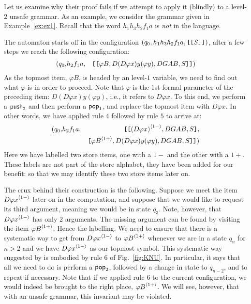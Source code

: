 Let us examine why their proof fails if we attempt to apply it
(blindly) to a level-$2$ unsafe grammar. As an example, we
consider the grammar given in Example~\ref{ex:ex1}. Recall that
the word $h_1h_3h_2f_1a$ is \emph{not} in the language.

The automaton starts off in the configuration $(q_0, h_1h_3h_2f_1a,
\hbox{\tt [}{\hbox{\tt [}{S}\hbox{\tt ]}}\hbox{\tt ]})$, after a few steps we reach the following configuration:
\begin{eqnarray}
\nonumber (q_0, & h_2f_1a, & \hbox{\tt [}{\hbox{\tt [}{\varphi B, D(D \varphi x) y (\varphi y), DGAB,S}\hbox{\tt ]}}\hbox{\tt ]})
\end{eqnarray}
As the topmost item, $\varphi B$, is headed by an level-$1$
variable, we need to find out what $\varphi$ is in order to
proceed. Note that $\varphi$ is the $1$st formal parameter of the
preceding item: $ D (D \varphi x) y (\varphi y)$, i.e., it refers
to $D \varphi x$. To this end, we perform a ${\sf push}_2$ and then
perform a ${\sf pop}_1$, and replace the topmost item with $D \varphi
x$. In other words, we have applied rule $4$ followed by rule $5$
to arrive at:
\begin{eqnarray}
\nonumber (q_0, & h_2f_1a, & \hbox{\tt [}\hbox{\tt [}{{(D \varphi x)}^{\langle{1-}\rangle}, DGAB, S}\hbox{\tt ]},\\
\nonumber & & \hbox{\tt [}{{\varphi B}^{\langle{1+}\rangle}, D (D \varphi x) y (\varphi
y), DGAB,S}\hbox{\tt ]}\hbox{\tt ]})
\end{eqnarray}
Here we have labelled two store items, one with a $1-$ and the
other with a $1+$. These labels are not part of the store
alphabet, they have been added for our benefit: so that we may
identify these two store items later on.

The crux behind their construction is the following. Suppose we
meet the item ${D\varphi x}^{\langle{1-}\rangle}$ later on in the
computation, and suppose that we would like to request its third
argument, meaning we would be in state $q_3$. Note, however, that
${D \varphi x}^{\langle{1-}\rangle}$ has only 2 arguments. The missing
argument can be found by visiting the item ${\varphi
B}^{\langle{1+}\rangle}$. Hence the labelling. We need to ensure that there is a
systematic way to get from ${D \varphi x}^{\langle{1-}\rangle}$ to
${\varphi B}^{\langle{1+}\rangle}$ whenever we are in a state $q_n$ for $n >
2$ and we have ${D \varphi x}^{\langle{1-}\rangle}$ as our topmost symbol.
This systematic way suggested by \cite{KNU02} is embodied by rule
$6$ of Fig.~\ref{fig:KNU}. In particular, it says that all we need
to do is perform a ${\sf pop}_2$, followed by a change in state to
$q_{n-2}$, and to repeat if necessary. Note that if we applied
rule $6$ to the current configuration, we would indeed be brought
to the right place, ${\varphi B}^{\langle{1+}\rangle}$. We will see,
however, that with an unsafe grammar, this invariant may be
violated.

